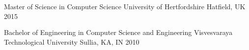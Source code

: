 
\begin{cventries}
    \cventry
    {Master of Science in Computer Science} %
    {University of Hertfordshire} %
    {Hatfield, UK} %
    {2015} %
    {
    }

    \cventry
    {Bachelor of Engineering in Computer Science and Engineering} %
    {Visvesvaraya Technological University} %
    {Sullia, KA, IN} %
    {2010} %
    {
    }
\end{cventries}
